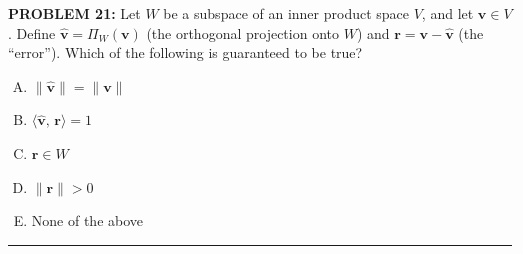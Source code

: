 \documentclass[12pt]{amsart}
\newcommand{\divider}{
  \vspace{-1em} %
  \noindent
  \raisebox{-0.15ex}{\textbullet}%
  \hspace{0.5em}%
  \rule[0.5ex]{0.95\textwidth}{1.0pt}%
  \hspace{0.5em}%
  \raisebox{-0.15ex}{\textbullet}%
  \vspace{0em} %
}
\begin{document}


{\bf PROBLEM 21:}
%
Let $W$ be a subspace of an inner product space $V$, and let $\mathbf{v} \in V$. Define $\hat{\mathbf{v}} = \Pi_W(\mathbf{v})$ (the orthogonal projection onto $W$) and $\mathbf{r} = \mathbf{v} - \hat{\mathbf{v}}$ (the ``error''). Which of the following is guaranteed to be true?

\begin{enumerate}[(A)]
\item $\|\hat{\mathbf{v}}\| = \|\mathbf{v}\|$
\item $\langle \hat{\mathbf{v}},\, \mathbf{r} \rangle = 1$
\item $\mathbf{r} \in W$
\item $\|\mathbf{r}\| > 0$
\item None of the above
\end{enumerate}

\divider
\end{document}
